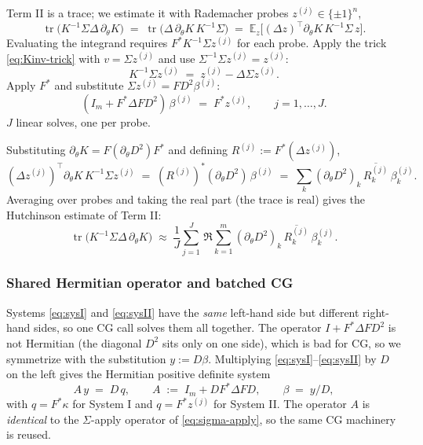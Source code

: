 \documentclass{article}
\newcommand{\E}{\mathbb{E}}
\DeclareMathOperator{\tr}{tr}
\begin{document}
Term II is a trace; we estimate it with Rademacher probes $z^{(j)}\in\{\pm1\}^{n}$,
\[
  \tr\!\bigl(K^{-1}\Sigma\Delta\,\partial_\theta K\bigr)
  \;=\;
  \tr\!\bigl(\Delta\,\partial_\theta K\,K^{-1}\Sigma\bigr)
  \;=\;
  \E_z\!\bigl[(\Delta z)^{\top}\partial_\theta K\,K^{-1}\Sigma\,z\bigr].
\]
Evaluating the integrand requires $F^{*}K^{-1}\Sigma z^{(j)}$ for each probe. Apply the trick \eqref{eq:Kinv-trick} with $v=\Sigma z^{(j)}$ and use $\Sigma^{-1}\Sigma z^{(j)}=z^{(j)}$:
\[
  K^{-1}\Sigma z^{(j)} \;=\; z^{(j)} - \Delta\Sigma z^{(j)}.
\]
Apply $F^{*}$ and substitute $\Sigma z^{(j)}=FD^{2}\beta^{(j)}$:
\begin{equation}
  \boxed{\;(I_m + F^{*}\Delta F D^{2})\,\beta^{(j)} \;=\; F^{*}z^{(j)},
    \qquad j=1,\ldots,J.\;}
  \label{eq:sysII}
\end{equation}
$J$ linear solves, one per probe.

Substituting $\partial_\theta K=F(\partial_\theta D^{2})F^{*}$ and defining $R^{(j)}:=F^{*}(\Delta z^{(j)})$,
\[
  (\Delta z^{(j)})^{\top}\partial_\theta K\,K^{-1}\Sigma z^{(j)}
  \;=\;
  (R^{(j)})^{*}(\partial_\theta D^{2})\,\beta^{(j)}
  \;=\;
  \sum_{k}(\partial_\theta D^{2})_{k}\,\overline{R^{(j)}_{k}}\,\beta^{(j)}_{k}.
\]
Averaging over probes and taking the real part (the trace is real) gives the Hutchinson estimate of Term II:
\begin{equation}
  \tr\!\bigl(K^{-1}\Sigma\Delta\,\partial_\theta K\bigr)
  \;\approx\;
  \frac{1}{J}\sum_{j=1}^{J}\,\Re\!\sum_{k=1}^{m}
  (\partial_\theta D^{2})_{k}\,\overline{R^{(j)}_{k}}\,\beta^{(j)}_{k}.
  \label{eq:termII}
\end{equation}

\subsubsection{Shared Hermitian operator and batched CG}

Systems \eqref{eq:sysI} and \eqref{eq:sysII} have the \emph{same} left-hand side but different right-hand sides, so one CG call solves them all together. The operator $I+F^{*}\Delta F D^{2}$ is not Hermitian (the diagonal $D^{2}$ sits only on one side), which is bad for CG, so we symmetrize with the substitution $y:=D\beta$. Multiplying \eqref{eq:sysI}--\eqref{eq:sysII} by $D$ on the left gives the Hermitian positive definite system
\begin{equation}
  A\,y \;=\; D\,q,
  \qquad
  A \;:=\; I_m + D F^{*}\Delta F D,
  \qquad
  \beta \;=\; y / D,
  \label{eq:Asys}
\end{equation}
with $q=F^{*}\kappa$ for System I and $q=F^{*}z^{(j)}$ for System II. The operator $A$ is \emph{identical} to the $\Sigma$-apply operator of \eqref{eq:sigma-apply}, so the same CG machinery is reused.
\end{document}
